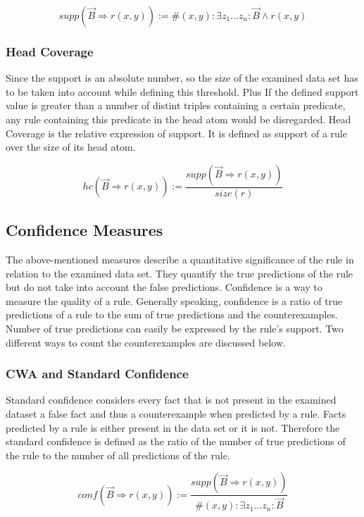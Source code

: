 $$ supp(\vec{B} \Rightarrow r(x,y)) := \# (x,y): \exists z_{1}\ldots z_{n}: \vec{B} \land r(x,y) $$

\subsubsection{Head Coverage}

Since the support is an absolute number, so the size of the examined data set has to be taken into account while defining this threshold. Plus If the defined support value is greater than a number of distint triples containing a certain predicate, any rule containing this predicate in the head atom would be disregarded. Head Coverage is the relative expression of support. It is defined as support of a rule over the size of its head atom.

$$ hc(\vec{B} \Rightarrow r(x,y)) := \frac{supp(\vec{B} \Rightarrow r(x,y))}{size(r)}  $$

\subsection{Confidence Measures}

The above-mentioned measures describe a quantitative significance of the rule in relation to the examined data set. They quantify the true predictions of the rule but do not take into account the false predictions. Confidence is a way to measure the quality of a rule. Generally speaking, confidence is a ratio of true predictions of a rule to the sum of true predictions and the counterexamples. Number of true predictions can easily be expressed by the rule's support. Two different ways to count the counterexamples are discussed below.

\subsubsection{CWA and Standard Confidence}

Standard confidence considers every fact that is not present in the examined dataset a false fact and thus a counterexample when predicted by a rule. Facts predicted by a rule is either present in the data set or it is not. Therefore the standard confidence is defined as the ratio of the number of true predictions of the rule to the number of all predictions of the rule.

$$ conf(\vec{B} \Rightarrow r(x,y)) := \frac{supp(\vec{B} \Rightarrow r(x,y))}{\# (x,y): \exists z_{1}\ldots z_{n}: \vec{B}} $$


